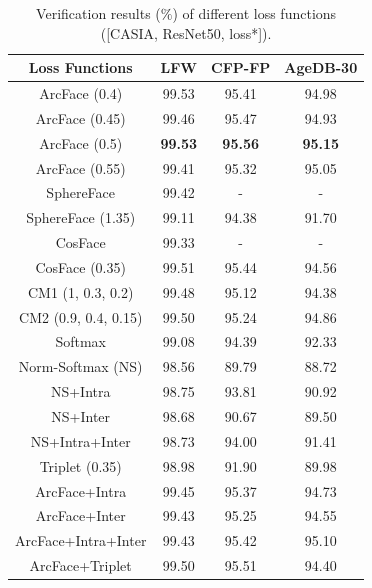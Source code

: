 \documentclass[10pt,twocolumn,letterpaper]{article}
\begin{document}
\begin{table}[ht!]
\begin{center}
\begin{tabular}{c|c|c|c}
\hline
Loss Functions   & LFW & CFP-FP & AgeDB-30 \\
\hline
ArcFace (0.4)         & 99.53 & 95.41 & 94.98   \\
ArcFace (0.45)        & 99.46 & 95.47 & 94.93 \\
ArcFace (0.5)         & {\bf 99.53} & {\bf 95.56} & {\bf 95.15}\\
ArcFace (0.55)        & 99.41  & 95.32   & 95.05   \\
\hline
SphereFace \cite{liu2017sphereface}  & 99.42 & - & - \\
SphereFace (1.35)                    & 99.11 & 94.38 & 91.70 \\
CosFace \cite{tencent2017CosineFace} & 99.33 & - & - \\
CosFace (0.35)                       & 99.51 & 95.44 & 94.56 \\
\hline
CM1 (1, 0.3, 0.2)                    & 99.48 & 95.12 & 94.38 \\
CM2 (0.9, 0.4, 0.15)                 & 99.50 & 95.24 & 94.86 \\
\hline
Softmax              & 99.08 & 94.39 & 92.33 \\
Norm-Softmax (NS)    & 98.56 & 89.79 & 88.72 \\
NS+Intra             & 98.75 & 93.81 & 90.92 \\
NS+Inter             & 98.68 & 90.67 & 89.50 \\
NS+Intra+Inter       & 98.73 & 94.00 & 91.41 \\
Triplet (0.35)       & 98.98 & 91.90 & 89.98 \\
ArcFace+Intra        & 99.45 & 95.37 & 94.73 \\
ArcFace+Inter        & 99.43 & 95.25 & 94.55 \\
ArcFace+Intra+Inter  & 99.43 & 95.42 & 95.10 \\
ArcFace+Triplet      & 99.50 & 95.51 & 94.40  \\
\hline
\end{tabular}
\end{center}
\vspace{-2mm}
\caption{Verification results ($\%$) of different loss functions ([CASIA, ResNet50, loss*]).}
\label{table:losscompare}
\vspace{-3mm}
\end{table}
\end{document}
